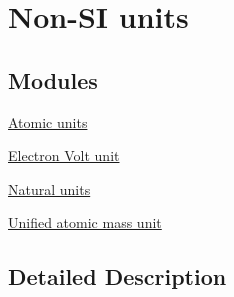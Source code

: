 \hypertarget{group___non-_s_i}{}\section{Non-\/\+SI units}
\label{group___non-_s_i}
\subsection*{Modules}
\begin{DoxyCompactItemize}
\item 
\hyperlink{group___atomic_unit}{Atomic units}
\item 
\hyperlink{group___electron_volt_unit}{Electron Volt unit}
\item 
\hyperlink{group___natural_unit}{Natural units}
\item 
\hyperlink{group___unified_atomic_mass_unit}{Unified atomic mass unit}
\end{DoxyCompactItemize}


\subsection{Detailed Description}
